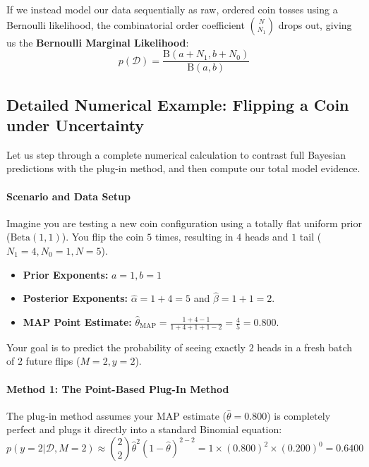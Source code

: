 \documentclass{article}
\begin{document}
If we instead model our data sequentially as raw, ordered coin tosses using a Bernoulli likelihood, the combinatorial order coefficient $\binom{N}{N_1}$ drops out, giving us the \textbf{Bernoulli Marginal Likelihood}:
\begin{equation}
p(\mathcal{D}) = \frac{\text{B}(a + N_1, b + N_0)}{\text{B}(a, b)}
\end{equation}

\subsection{Detailed Numerical Example: Flipping a Coin under Uncertainty}

Let us step through a complete numerical calculation to contrast full Bayesian predictions with the plug-in method, and then compute our total model evidence.

\paragraph{Scenario and Data Setup}
Imagine you are testing a new coin configuration using a totally flat uniform prior ($\text{Beta}(1,1)$). You flip the coin $5$ times, resulting in $4$ heads and $1$ tail ($N_1 = 4, N_0 = 1, N = 5$).
\begin{itemize}
    \item \textbf{Prior Exponents:} $a = 1, b = 1$
    \item \textbf{Posterior Exponents:} $\hat{\alpha} = 1 + 4 = 5$ and $\hat{\beta} = 1 + 1 = 2$.
    \item \textbf{MAP Point Estimate:} $\hat{\theta}_{\text{MAP}} = \frac{1+4-1}{1+4+1+1-2} = \frac{4}{5} = 0.800$.
\end{itemize}

Your goal is to predict the probability of seeing exactly $2$ heads in a fresh batch of $2$ future flips ($M = 2, y = 2$).

\paragraph{Method 1: The Point-Based Plug-In Method}
The plug-in method assumes your MAP estimate ($\hat{\theta} = 0.800$) is completely perfect and plugs it directly into a standard Binomial equation:
\begin{equation}
p(y=2|\mathcal{D}, M=2) \approx \binom{2}{2}\hat{\theta}^2(1-\hat{\theta})^{2-2} = 1 \times (0.800)^2 \times (0.200)^0 = 0.6400
\end{equation}
\end{document}
